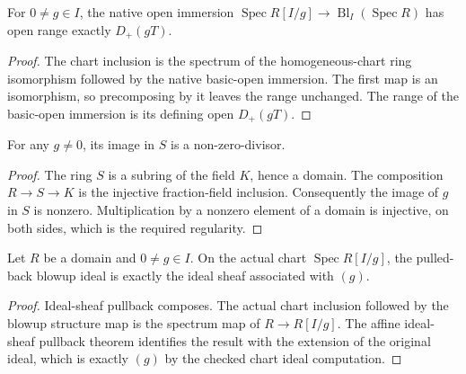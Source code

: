 \endgroup

\begingroup

\begin{lemma}
\label{lem:affine-blowup-fraction-chart-range}
\leanok
For $0\ne g\in I$, the native open immersion
$\operatorname{Spec}R[I/g]\to\operatorname{Bl}_I(\operatorname{Spec}R)$
has open range exactly $D_+(gT)$.
\end{lemma}
\begin{proof}
The chart inclusion is the spectrum of the homogeneous-chart ring
isomorphism followed by the native basic-open immersion. The first
map is an isomorphism, so precomposing by it leaves the range
unchanged. The range of the basic-open immersion is its defining
open $D_+(gT)$.
\end{proof}

\endgroup

\begingroup

\begin{lemma}
\label{lem:blowup-chart-equation-regular}
\leanok
For any $g\ne0$, its image in $S$ is a non-zero-divisor.
\end{lemma}
\begin{proof}
The ring $S$ is a subring of the field $K$, hence a domain. The
composition $R\to S\to K$ is the injective fraction-field inclusion.
Consequently the image of $g$ in $S$ is nonzero. Multiplication by
a nonzero element of a domain is injective, on both sides, which is
the required regularity.
\end{proof}

\endgroup

\begingroup

\begin{lemma}
\label{lem:blowup-exceptional-ideal-chart}
\leanok
Let $R$ be a domain and $0\ne g\in I$. On the actual chart
$\operatorname{Spec}R[I/g]$, the pulled-back blowup ideal is exactly the
ideal sheaf associated with $(g)$.
\end{lemma}
\begin{proof}
Ideal-sheaf pullback composes. The actual chart inclusion followed by
the blowup structure map is the spectrum map of $R\to R[I/g]$.
The affine ideal-sheaf pullback theorem identifies the result with the
extension of the original ideal, which is exactly $(g)$ by the checked
chart ideal computation.
\end{proof}

